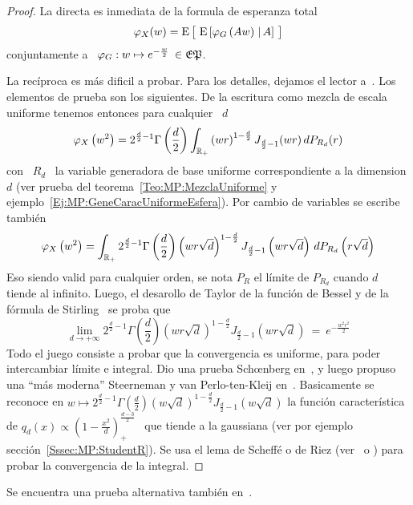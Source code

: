 \begin{proof}
  La directa es inmediata de la formula de esperanza total
  \[
  \varphi_X(w)  = \operatorname{E}\big[  \, \operatorname{E}\left[  \varphi_G\left( A  w  \right) \left.
    \right| A\right] \, \big]
  \]
  conjuntamente a \ $\varphi_G: w \mapsto e^{-\frac{w}{2}} \: \in \mathfrak{EP}$.

  La rec\'iproca es m\'as dificil a probar. Para los detalles, dejamos el lector
  a~\cite{Sch38}. Los  elementos de prueba  son los siguientes. De  la escritura
  como mezcla de escala uniforme tenemos entonces para cualquier \ $d$
  \[
  \varphi_X\left(  w^2  \right)  =  2^{\frac{d}{2}-1}  \Gamma\left(  \frac{d}{2}
  \right) \int_{\mathbb{R}_+} \left(  w r \right)^{1-\frac{d}{2}} J_{\frac{d}{2}-1}(w
  r) \, dP_{R_d}(r)
  \]
  con \  $R_d$ \ la  variable generadora de  base uniforme correspondiente  a la
  dimension   $d$   (ver   prueba  del   teorema~\ref{Teo:MP:MezclaUniforme}   y
  ejemplo~\ref{Ej:MP:GeneCaracUniformeEsfera}).  Por   cambio  de  variables  se
  escribe tambi\'en
  \[
  \varphi_X\left(  w^2 \right)  = \int_{\mathbb{R}_+}  2^{\frac{d}{2}-1} \Gamma\left(
    \frac{d}{2}   \right)   \left(    w   r   \sqrt{d}   \right)^{1-\frac{d}{2}}
  J_{\frac{d}{2}-1}\left(  w r  \sqrt{d}  \right) \,  dP_{R_d}\left( r  \sqrt{d}
  \right)
  \]
  Eso siendo valid para cualquier orden,  se nota $P_R$ el l\'imite de $P_{R_d}$
  cuando $d$ tiende al infinito.  Luego,  el desarollo de Taylor de la funci\'on
  de Bessel  y de  la f\'ormula de  Stirling~\cite[Ec.~8.402~y~8.327]{GraRyz} se
  proba que
  \[
  \lim_{d \to +\infty} 2^{\frac{d}{2}-1} \Gamma\left( \frac{d}{2} \right) \left(
    w  r \sqrt{d} \right)^{1-\frac{d}{2}}  J_{\frac{d}{2}-1}\left( w  r \sqrt{d}
  \right) \: = \: e^{-\frac{w^2 r^2}{2}}
  \]
  Todo el  juego consiste a probar  que la convergencia es  uniforme, para poder
  intercambiar   l\'imite   e    integral.    Dio   una   prueba   Sch{\oe}nberg
  en~\cite{Sch38},  y  luego propuso  una  ``m\'as  moderna''  Steerneman y  van
  Perlo-ten-Kleij  en~\cite{SteVan05}.  Basicamente  se reconoce  en  $w \mapsto
  2^{\frac{d}{2}-1}   \Gamma\left(  \frac{d}{2}   \right)   \left(  w   \sqrt{d}
  \right)^{1-\frac{d}{2}}   J_{\frac{d}{2}-1}\left(  w   \sqrt{d}   \right)$  la
  funci\'on  caracter\'istica  de  $q_d(x)  \propto  \left(  1  -  \frac{x^2}{d}
  \right)_+^{\frac{d-3}{2}}$  \  que tiende  a  la  gaussiana  (ver por  ejemplo
  secci\'on~\ref{Sssec:MP:StudentR}).   Se usa el  lema de  Scheff\'e o  de Riez
  (ver~\cite{Rie28,  Sch47, Nov72,  Kus10} o  \cite{AthLah06,  Bog07:v1, Bil12})
  para probar la convergencia de la integral.
\end{proof}
%
\noindent  Se  encuentra  una  prueba alternativa  tambi\'en  en~\cite{FanKot90,
  Kin72}.

